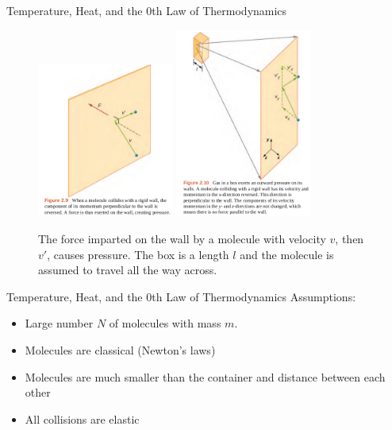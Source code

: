\documentclass{beamer}
\begin{document}
\begin{frame}{Temperature, Heat, and the 0th Law of Thermodynamics}
\small
\begin{figure}
\centering
\includegraphics[width=0.4\textwidth]{figures/p1.png}
\includegraphics[width=0.4\textwidth]{figures/p2.png}
\caption{\label{fig:p1} The force imparted on the wall by a molecule with velocity $v$, then $v'$, causes pressure.  The box is a length $l$ and the molecule is assumed to travel all the way across.}
\end{figure}
\end{frame}

\begin{frame}{Temperature, Heat, and the 0th Law of Thermodynamics}
Assumptions:
\begin{itemize}
\item Large number $N$ of molecules with mass $m$.
\item Molecules are classical (Newton's laws)
\item Molecules are much smaller than the container and distance between each other
\item All collisions are elastic
\end{itemize}
\end{frame}
\end{document}
